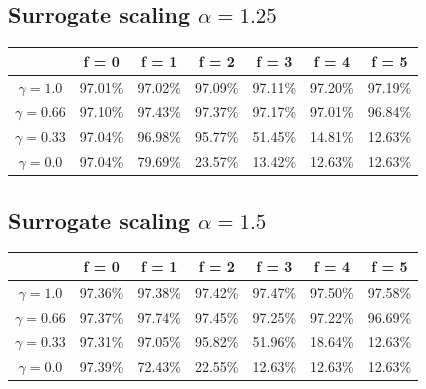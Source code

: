\documentclass{article}
\begin{document}
\subsection{Surrogate scaling $\alpha = 1.25$}
\begin{table}[htbp]
    \centering
    \begin{tabular}{ccccccc}
        \toprule
        & \textbf{f = 0} & \textbf{f = 1} & \textbf{f = 2} & \textbf{f = 3} & \textbf{f = 4} & \textbf{f = 5} \\
        \midrule
        $\gamma = 1.0$ & 97.01\% & 97.02\% & 97.09\% & 97.11\% & 97.20\% & 97.19\% \\
        $\gamma = 0.66$ & 97.10\% & 97.43\% & 97.37\% & 97.17\% & 97.01\% & 96.84\% \\
        $\gamma = 0.33$ & 97.04\% & 96.98\% & 95.77\% & 51.45\% & 14.81\% & 12.63\% \\
        $\gamma = 0.0$ & 97.04\% & 79.69\% & 23.57\% & 13.42\% & 12.63\% & 12.63\% \\
        \bottomrule
    \end{tabular}
\end{table}
\subsection{Surrogate scaling $\alpha = 1.5$}
\begin{table}[htbp]
    \centering
    \begin{tabular}{ccccccc}
        \toprule
        & \textbf{f = 0} & \textbf{f = 1} & \textbf{f = 2} & \textbf{f = 3} & \textbf{f = 4} & \textbf{f = 5} \\
        \midrule
        $\gamma = 1.0$ & 97.36\% & 97.38\% & 97.42\% & 97.47\% & 97.50\% & 97.58\% \\
        $\gamma = 0.66$ & 97.37\% & 97.74\% & 97.45\% & 97.25\% & 97.22\% & 96.69\% \\
        $\gamma = 0.33$ & 97.31\% & 97.05\% & 95.82\% & 51.96\% & 18.64\% & 12.63\% \\
        $\gamma = 0.0$ & 97.39\% & 72.43\% & 22.55\% & 12.63\% & 12.63\% & 12.63\% \\
        \bottomrule
    \end{tabular}
\end{table}
\end{document}
